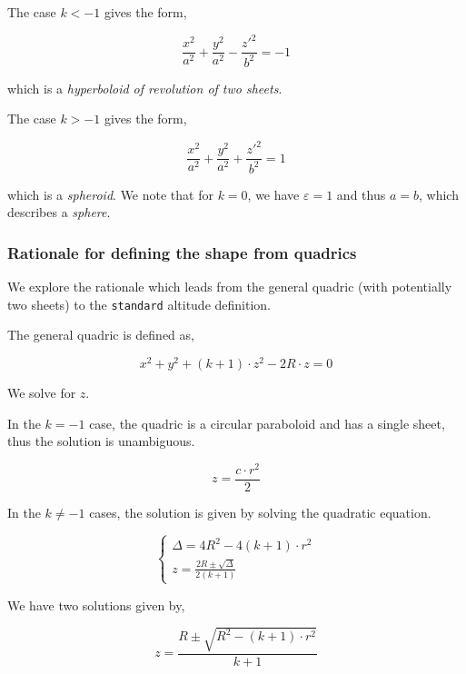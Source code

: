 The case $k < -1$ gives the form,

\begin{equation}
\frac{x^2}{a^2} + \frac{y^2}{a^2} - \frac{z'^2}{b^2} = -1
\end{equation}

which is a \emph{hyperboloid of revolution of two sheets}.

The case $k > -1$ gives the form,

\begin{equation}
\frac{x^2}{a^2} + \frac{y^2}{a^2} + \frac{z'^2}{b^2} = 1
\end{equation}

which is a \emph{spheroid}. We note that for $k=0$, we have
$\varepsilon=1$ and thus $a=b$, which describes a \emph{sphere}.

\subsubsection{Rationale for defining the shape from quadrics}
We explore the rationale which leads from the general quadric (with potentially
two sheets) to the \lstinline{standard} altitude definition.

The general quadric is defined as,

\begin{equation}
x^2 + y^2 + (k+1) \cdot z^2 - 2 R \cdot z = 0
\end{equation}

We solve for $z$.

In the $k=-1$ case, the quadric is a circular paraboloid and has a single
sheet, thus the solution is unambiguous.

\begin{equation}
z = \frac{c \cdot r^2}{2}
\end{equation}

In the $k\neq-1$ cases, the solution is given by solving the quadratic equation.

\begin{equation} \begin{cases}
\Delta = 4 R^2 - 4 (k+1) \cdot r^2 \\
z = \frac{2R \pm \sqrt{\Delta}}{2(k+1)}
\end{cases} \end{equation}

We have two solutions given by,

\begin{equation}
z = \frac{R \pm \sqrt{R^2 - (k+1) \cdot r^2}}{k + 1}
\end{equation}

